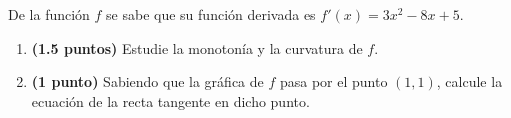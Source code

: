 
De la función $f$ se sabe que su función derivada es $f'(x)=3x^2-8x+5$.
\begin{enumerate}[label=\alph*)]
\item \textbf{(1.5 puntos)} Estudie la monotonía y la curvatura de $f$.
\item \textbf{(1 punto)} Sabiendo que la gráfica de $f$ pasa por el punto $(1,1)$, calcule la ecuación de la recta tangente en dicho punto.
\end{enumerate}
